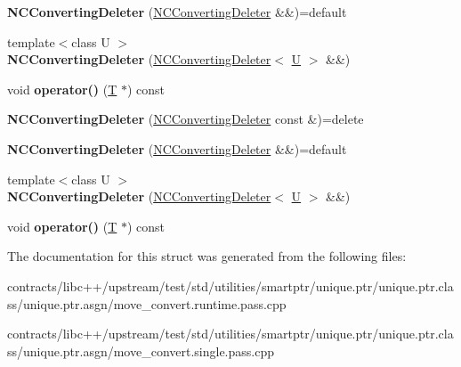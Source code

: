 \begin{DoxyCompactItemize}
{\bfseries N\+C\+Converting\+Deleter} (\mbox{\hyperlink{struct_n_c_converting_deleter}{N\+C\+Converting\+Deleter}} \&\&)=default
\item 
\mbox{\label{struct_n_c_converting_deleter_3_01_t[]_4_aec19330560f43e6aa09ddab776ede544}} 
{\footnotesize template$<$class U $>$ }\\{\bfseries N\+C\+Converting\+Deleter} (\mbox{\hyperlink{struct_n_c_converting_deleter}{N\+C\+Converting\+Deleter}}$<$ \mbox{\hyperlink{union_u}{U}} $>$ \&\&)
\item 
\mbox{\label{struct_n_c_converting_deleter_3_01_t[]_4_ab753b1278ee31d806af4177d4e87bc70}} 
void {\bfseries operator()} (\mbox{\hyperlink{struct_t}{T}} $\ast$) const
\item 
\mbox{\label{struct_n_c_converting_deleter_3_01_t[]_4_a0e45111d9b7fd818aab08ab107bc6edf}} 
{\bfseries N\+C\+Converting\+Deleter} (\mbox{\hyperlink{struct_n_c_converting_deleter}{N\+C\+Converting\+Deleter}} const \&)=delete
\item 
\mbox{\label{struct_n_c_converting_deleter_3_01_t[]_4_a5679c2de8d7529caf73c5f9027658f6e}} 
{\bfseries N\+C\+Converting\+Deleter} (\mbox{\hyperlink{struct_n_c_converting_deleter}{N\+C\+Converting\+Deleter}} \&\&)=default
\item 
\mbox{\label{struct_n_c_converting_deleter_3_01_t[]_4_aec19330560f43e6aa09ddab776ede544}} 
{\footnotesize template$<$class U $>$ }\\{\bfseries N\+C\+Converting\+Deleter} (\mbox{\hyperlink{struct_n_c_converting_deleter}{N\+C\+Converting\+Deleter}}$<$ \mbox{\hyperlink{union_u}{U}} $>$ \&\&)
\item 
\mbox{\label{struct_n_c_converting_deleter_3_01_t[]_4_ab753b1278ee31d806af4177d4e87bc70}} 
void {\bfseries operator()} (\mbox{\hyperlink{struct_t}{T}} $\ast$) const
\end{DoxyCompactItemize}


The documentation for this struct was generated from the following files\+:\begin{DoxyCompactItemize}
\item 
contracts/libc++/upstream/test/std/utilities/smartptr/unique.\+ptr/unique.\+ptr.\+class/unique.\+ptr.\+asgn/move\+\_\+convert.\+runtime.\+pass.\+cpp\item 
contracts/libc++/upstream/test/std/utilities/smartptr/unique.\+ptr/unique.\+ptr.\+class/unique.\+ptr.\+asgn/move\+\_\+convert.\+single.\+pass.\+cpp\end{DoxyCompactItemize}
